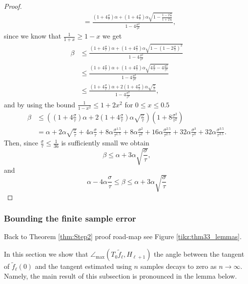\documentclass[12pt]{article}
\theoremstyle{remark}
\newcommand{\wtilde}[1]{\widetilde{#1}}
\newcommand{\lrbrackets}[1]{\left( #1 \right)}
\newcommand{\maxangle}{\angle_{\max}}
\begin{document}
\begin{appendices}
\begin{proof}
\begin{align*}
	&=
	\frac{\lrbrackets{1 +4\frac{\sigma}{\tau}}\alpha + \lrbrackets{1 + 4 \frac{\sigma}{\tau} }\alpha\sqrt{1 - \frac{{1 - 2 \frac{\sigma}{\tau} }}{{1 + 2 \frac{\sigma}{\tau} }}}}{1 - 4\frac{\sigma^2}{\tau^2}} 
	,\end{align*}
	since we know that $ \frac{1}{1 + x} \geq 1 - x $ we get
	\begin{align*}
	\beta 
	&\leq
	\frac{\lrbrackets{1 +4\frac{\sigma}{\tau}}\alpha + \lrbrackets{1 + 4 \frac{\sigma}{\tau} }\alpha\sqrt{1 - \lrbrackets{1 - 2 \frac{\sigma}{\tau}}^2}}{1 - 4\frac{\sigma^2}{\tau^2}} \\
	&\leq
	\frac{\lrbrackets{1 +4\frac{\sigma}{\tau}}\alpha + \lrbrackets{1 + 4 \frac{\sigma}{\tau} }\alpha\sqrt{4\frac{\sigma}{\tau} - 4\frac{\sigma^2}{\tau^2}}}{1 - 4\frac{\sigma^2}{\tau^2}}\\
	&\leq
	\frac{\lrbrackets{1 +4\frac{\sigma}{\tau}}\alpha + 2\lrbrackets{1 + 4 \frac{\sigma}{\tau} }\alpha\sqrt{\frac{\sigma}{\tau}}}{1 - 4\frac{\sigma^2}{\tau^2}}
	,\end{align*}
	and by using the bound $ \frac{1}{1 - x^2} \leq 1 + 2 x^2 $ for $ 0 \leq x \leq 0.5 $	
	\begin{align*}
	\beta
	&\leq
	\lrbrackets{\lrbrackets{1 +4\frac{\sigma}{\tau}}\alpha + 2\lrbrackets{1 + 4 \frac{\sigma}{\tau} }\alpha\sqrt{\frac{\sigma}{\tau}}}\lrbrackets{1 + 8\frac{\sigma^2}{\tau^2}} \\
	&=
	\alpha + 2\alpha\sqrt{\frac{\sigma}{\tau}} + 4\alpha\frac{\sigma}{\tau} + 8 \alpha\frac{\sigma^{1.5}}{\tau^{1.5}} + 8\alpha\frac{\sigma^2}{\tau^2} + 16\alpha\frac{\sigma^{2.5}}{\tau^{2.5}} + 32\alpha\frac{\sigma^{3}}{\tau^{3}} + 32\alpha\frac{\sigma^{3.5}}{\tau^{3.5}}
	.\end{align*}
	Then, since $ \frac{\sigma}{\tau}\leq \frac{1}{36} $ is sufficiently small we obtain 
	\[
	\beta \leq \alpha + 3\alpha\sqrt{\frac{\sigma}{\tau}}
	,\]
	and 
	\[
	\alpha - 4\alpha\frac{\sigma}{\tau}  \leq \beta \leq \alpha + 3\alpha\sqrt{\frac{\sigma}{\tau}}
	\]
\end{proof}%

\subsubsection{Bounding the finite sample error}\label{sec:FiniteSample_err}
Back to Theorem \ref{thm:Step2} proof road-map see Figure \ref{tikz:thm33_lemmas}.

\noindent In this section we show that  $ \maxangle(T_0 \wtilde f_\ell, H_{\ell + 1}) $ the angle between the tangent of $\wtilde{f}_\ell(0)$ and the tangent estimated using $n$ samples decays to zero as $n\to \infty$.
Namely, the main result of this subsection is pronounced in the lemma below.


\end{appendices}
\end{document}
